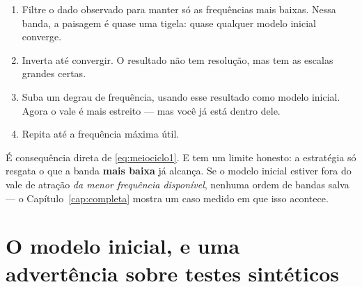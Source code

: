 \documentclass[11pt,a4paper,oneside]{report}
\begin{document}
\begin{center}
\end{center}

\begin{enumerate}[leftmargin=*]
\item Filtre o dado observado para manter s\'o as frequ\^encias mais baixas.
Nessa banda, a paisagem \'e quase uma tigela: quase qualquer modelo inicial
converge.
\item Inverta at\'e convergir. O resultado n\~ao tem resolu\c{c}\~ao, mas tem
as escalas grandes certas.
\item Suba um degrau de frequ\^encia, usando esse resultado como modelo
inicial. Agora o vale \'e mais estreito --- mas voc\^e j\'a est\'a dentro
dele.
\item Repita at\'e a frequ\^encia m\'axima \'util.
\end{enumerate}

\begin{atencao}
\'E consequ\^encia direta de \eqref{eq:meiociclo1}. E tem um limite honesto:
a estrat\'egia s\'o resgata o que a banda \textbf{mais baixa} j\'a alcan\c{c}a.
Se o modelo inicial estiver fora do vale de atra\c{c}\~ao \emph{da menor
frequ\^encia dispon\'ivel}, nenhuma ordem de bandas salva --- o
Cap\'itulo~\ref{cap:completa} mostra um caso medido em que isso acontece.
\end{atencao}

\section{O modelo inicial, e uma advert\^encia sobre testes sint\'eticos}
\end{document}
